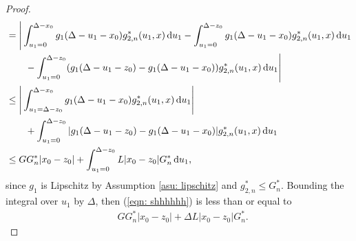 \begin{proof}
\begin{align}
		\nonumber &{} = \Bigg|\int_{u_1=0}^{\Delta-x_0}g_1(\Delta - u_1 - x_0)g^*_{2,n}(u_1,x)\, \mathrm{d} u_1 - \int_{u_1=0}^{\Delta-z_0}g_1(\Delta - u_1 - x_0)g^*_{2,n}(u_1,x)\, \mathrm{d} u_1
		\\\nonumber &\qquad{} - \int_{u_1=0}^{\Delta-z_0}(g_1(\Delta - u_1 - z_0)-g_1(\Delta - u_1 - x_0))g^*_{2,n}(u_1,x)\, \mathrm{d} u_1\Bigg|
		\\\nonumber& \leq  \Bigg|\int_{u_1=\Delta-z_0}^{\Delta-x_0}g_1(\Delta - u_1 - x_0)g^*_{2,n}(u_1,x)\, \mathrm{d} u_1\Bigg|
		\\\nonumber &\qquad{} + \int_{u_1=0}^{\Delta-z_0}|g_1(\Delta - u_1 - z_0)-g_1(\Delta - u_1 - x_0)|g^*_{2,n}(u_1,x)\, \mathrm{d} u_1
		\\\label{eqn: shhhhhh}& \leq  GG^*_n|x_0-z_0|
		 + \int_{u_1=0}^{\Delta-z_0}L|x_0-z_0|G^*_n\, \mathrm{d} u_1,
	\end{align}
	{since \(g_1\) is Lipschitz by Assumption \ref{asu: lipschitz} and \(g_{2,n}^*\leq G_n^*\). Bounding the integral over \(u_1\) by \(\Delta\), then (\ref{eqn: shhhhhh}) is less than or equal to}
	\begin{align}
		&GG^*_n|x_0-z_0| + \Delta L|x_0-z_0|G^*_n.
	\end{align}
\end{proof}



